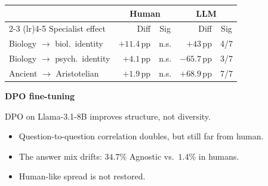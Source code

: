 \documentclass[a0paper,fleqn]{betterposter}
\renewcommand{\fontsizesection}{\fontsize{30}{36}\selectfont}
\renewcommand{\fontsizestandard}{\fontsize{28}{36}\selectfont}
\renewcommand{\section}[1]{%
\par\vspace{0.55em}%
{\fontsizesection\selectfont\textbf{#1}}\par\vspace{0.22em}%
}
\begin{document}
{{\fontsizestandard
\setlength{\tabcolsep}{5pt}
\begin{tabular}{@{}p{} r c r c@{}}
\toprule
& \multicolumn{2}{c}{Human} & \multicolumn{2}{c}{LLM} \\
\cmidrule(lr){2-3} \cmidrule(lr){4-5}
Specialist effect & Diff & Sig & Diff & Sig \\
\midrule
Biology $\to$ biol.\ identity
  & $+11.4$\,pp & n.s. & $+43$\,pp & 4/7 \\
Biology $\to$ psych.\ identity
  & $+4.1$\,pp & n.s. & $-65.7$\,pp & 3/7 \\
Ancient $\to$ Aristotelian
  & $+1.9$\,pp & n.s. & $+68.9$\,pp & 7/7 \\
\bottomrule
\end{tabular}
}

\section{DPO fine-tuning}
DPO on Llama-3.1-8B improves
structure, not diversity.

\begin{itemize}
\item Question-to-question correlation
doubles, but still far from human.
\item The answer mix drifts: $34.7\%$
Agnostic vs.\ $1.4\%$ in humans.
\item Human-like spread is not restored.
\end{itemize}

}
\end{document}

